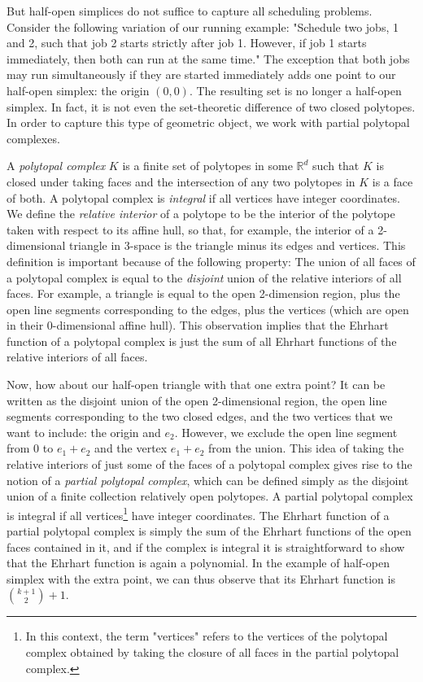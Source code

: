 \documentclass[12pt,reqno]{amsart}
\numberwithin{definition}{section}
\theoremstyle{definition}
\newcommand{\RR}{\mathbb{R}}
\begin{document}
But half-open simplices do not suffice to capture all scheduling problems. Consider the following variation of our running example: "Schedule two jobs, 1 and 2, such that job 2 starts strictly after job 1. However, if job 1 starts immediately, then both can run at the same time." The exception that both jobs may run simultaneously if they are started immediately adds one point to our half-open simplex: the origin $(0,0)$. The resulting set is no longer a half-open simplex. In fact, it is not even the set-theoretic difference of two closed polytopes. In order to capture this type of geometric object, we work with partial polytopal complexes.

A \emph{polytopal complex} $K$ is a finite set of polytopes in some $\RR^d$ such that $K$ is closed under taking faces and the intersection of any two polytopes in $K$ is a face of both. A polytopal complex is \emph{integral} if all vertices have integer coordinates. We define the \emph{relative interior} of a polytope to be the interior of the polytope taken with respect to its affine hull, so that, for example, the interior of a 2-dimensional triangle in 3-space is the triangle minus its edges and vertices. This definition is important because of the following property: The union of all faces of a polytopal complex is equal to the \emph{disjoint} union of the relative interiors of all faces. For example, a triangle is equal to the open 2-dimension region, plus the open line segments corresponding to the edges, plus the vertices (which are open in their 0-dimensional affine hull). This observation implies that the Ehrhart function of a polytopal complex is just the sum of all Ehrhart functions of the relative interiors of all faces.

Now, how about our half-open triangle with that one extra point? It can be written as the disjoint union of the open 2-dimensional region, the open line segments corresponding to the two closed edges, and the two vertices that we want to include: the origin and $e_2$. However, we exclude the open line segment from 0 to $e_1+e_2$ and the vertex $e_1+e_2$ from the union. This idea of taking the relative interiors of just some of the faces of a polytopal complex gives rise to the notion of a \emph{partial polytopal complex}, which can be defined simply as the disjoint union of a finite collection relatively open polytopes. A partial polytopal complex is integral if all vertices\footnote{In this context, the term "vertices" refers to the vertices of the polytopal complex obtained by taking the closure of all faces in the partial polytopal complex.} have integer coordinates. The Ehrhart function of a partial polytopal complex is simply the sum of the Ehrhart functions of the open faces contained in it, and if the complex is integral it is straightforward to show that the Ehrhart function is again a polynomial. In the example of half-open simplex with the extra point, we can thus observe that its Ehrhart function is $\binom{k+1}{2} + 1$.
\end{document}
